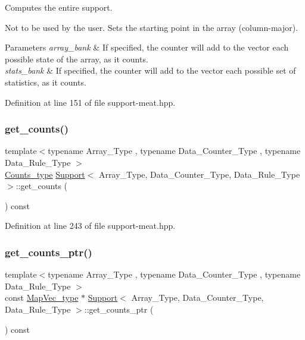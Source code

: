 Computes the entire support. 

Not to be used by the user. Sets the starting point in the array (column-\/major).


\begin{DoxyParams}{Parameters}
{\em array\+\_\+bank} & If specified, the counter will add to the vector each possible state of the array, as it counts.\\
\hline
{\em stats\+\_\+bank} & If specified, the counter will add to the vector each possible set of statistics, as it counts. \\
\hline
\end{DoxyParams}


Definition at line 151 of file support-\/meat.\+hpp.

\mbox{\label{class_support_a5d93a94eaed9b1157fb934284883fd47}} 
\subsubsection{\texorpdfstring{get\+\_\+counts()}{get\_counts()}}
{\footnotesize\ttfamily template$<$typename Array\+\_\+\+Type , typename Data\+\_\+\+Counter\+\_\+\+Type , typename Data\+\_\+\+Rule\+\_\+\+Type $>$ \\
\hyperlink{typedefs_8hpp_aee40fa17c1fddb63dd1f2b1470ade95b}{Counts\+\_\+type} \hyperlink{class_support}{Support}$<$ Array\+\_\+\+Type, Data\+\_\+\+Counter\+\_\+\+Type, Data\+\_\+\+Rule\+\_\+\+Type $>$\+::get\+\_\+counts (\begin{DoxyParamCaption}{ }\end{DoxyParamCaption}) const\hspace{0.3cm}{\ttfamily [inline]}}



Definition at line 243 of file support-\/meat.\+hpp.

\mbox{\label{class_support_abcb4dea3c5a1b140990821900432f90e}} 
\subsubsection{\texorpdfstring{get\+\_\+counts\+\_\+ptr()}{get\_counts\_ptr()}}
{\footnotesize\ttfamily template$<$typename Array\+\_\+\+Type , typename Data\+\_\+\+Counter\+\_\+\+Type , typename Data\+\_\+\+Rule\+\_\+\+Type $>$ \\
const \hyperlink{typedefs_8hpp_a02ed8dec96bc528c8bc3d8cb3c4674a5}{Map\+Vec\+\_\+type} $\ast$ \hyperlink{class_support}{Support}$<$ Array\+\_\+\+Type, Data\+\_\+\+Counter\+\_\+\+Type, Data\+\_\+\+Rule\+\_\+\+Type $>$\+::get\+\_\+counts\+\_\+ptr (\begin{DoxyParamCaption}{ }\end{DoxyParamCaption}) const\hspace{0.3cm}{\ttfamily [inline]}}



